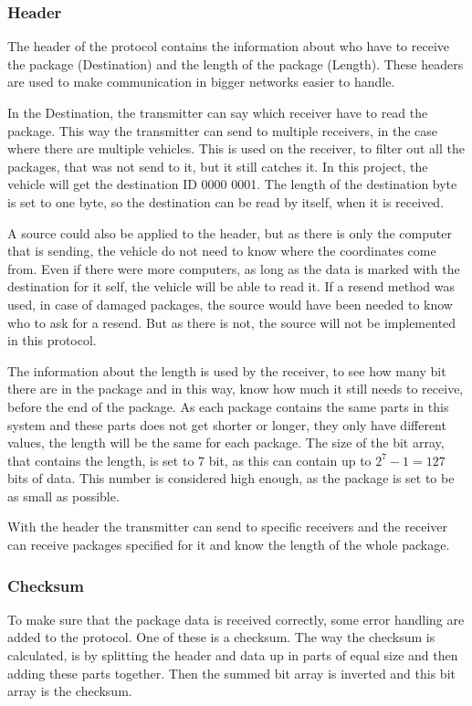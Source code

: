 \subsubsection{Header}
The header of the protocol  contains the information about who have to receive the package (Destination) and the length of the package (Length). These headers are used to make communication in bigger networks easier to handle.

In the Destination, the transmitter can say which receiver have to read the package. This way the transmitter can send to multiple receivers, in the case where there are multiple vehicles. This is used on the receiver, to filter out all the packages, that was not send to it, but it still catches it. In this project, the vehicle will get the destination ID 0000 0001. The length of the destination byte is set to one byte, so the destination can be read by itself, when it is received.

A source could also be applied to the header, but as there is only the computer that is sending, the vehicle do not need to know where the coordinates come from. Even if there were more computers, as long as the data is marked with the destination for it self, the vehicle will be able to read it. If a resend method was used, in case of damaged packages, the source would have been needed to know who to ask for a resend. But as there is not, the source will not be implemented in this protocol.

The information about the length is used by the receiver, to see how many bit there are in the package and in this way, know how much it still needs to receive, before the end of the package. As each package contains the same parts in this system and these parts does not get shorter or longer, they only have different values, the length will be the same for each package. The size of the bit array, that contains the length, is set to 7 bit, as this can contain up to $2^{7}-1 = 127$ bits of data. This number is considered high enough, as the package is set to be as small as possible.

With the header the transmitter can send to specific receivers and the receiver can receive packages specified for it and know the length of the whole package.

\subsubsection{Checksum}
To make sure that the package data is received correctly, some error handling are added to the protocol. One of these is a checksum. The way the checksum is calculated, is by splitting the header and data up in parts of equal size and then adding these parts together. Then the summed bit array is inverted and this bit array is the checksum. 


